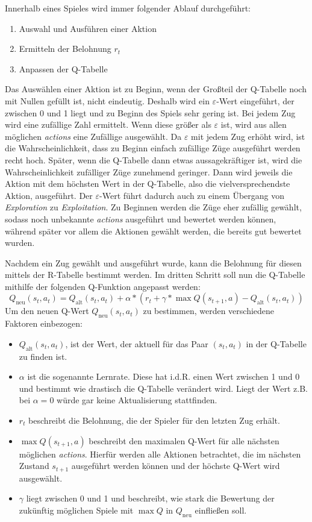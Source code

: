 \documentclass[12pt,a4paper]{article}
\begin{document}
Innerhalb eines Spieles wird immer folgender Ablauf durchgeführt:
\begin{enumerate}
    \item Auswahl und Ausführen einer Aktion
    \item Ermitteln der Belohnung $r_t$
    \item Anpassen der Q-Tabelle
\end{enumerate}
Das Auswählen einer Aktion ist zu Beginn, wenn der Großteil der Q-Tabelle noch mit Nullen gefüllt ist, nicht eindeutig. Deshalb wird ein $\varepsilon$-Wert eingeführt, der zwischen 0 und 1 liegt und zu Beginn des Spiels sehr gering ist. Bei jedem Zug wird eine zufällige Zahl ermittelt. Wenn diese größer als $\varepsilon$ ist, wird aus allen möglichen \textit{actions} eine Zufällige ausgewählt. Da $\varepsilon$ mit jedem Zug erhöht wird, ist die Wahrscheinlichkeit, dass zu Beginn einfach zufällige Züge ausgeführt werden recht hoch. Später, wenn die Q-Tabelle dann etwas aussagekräftiger ist, wird die Wahrscheinlichkeit zufälliger Züge zunehmend geringer. Dann wird jeweils die Aktion mit dem höchsten Wert in der Q-Tabelle, also die vielversprechendste Aktion, ausgeführt. Der $\varepsilon$-Wert führt dadurch auch zu einem Übergang von \textit{Exploration} zu \textit{Exploitation}. Zu Beginnen werden die Züge eher zufällig gewählt, sodass noch unbekannte \textit{actions} ausgeführt und bewertet werden können, während später vor allem die Aktionen gewählt werden, die bereits gut bewertet wurden. 

Nachdem ein Zug gewählt und ausgeführt wurde, kann die Belohnung für diesen mittels der R-Tabelle bestimmt werden. Im dritten Schritt soll nun die Q-Tabelle mithilfe der folgenden Q-Funktion angepasst werden:
$$Q_{\mathrm{neu}}(s_t,a_t)=Q_{\mathrm{alt}}(s_t,a_t)+\alpha*(r_t+\gamma*\max Q(s_{t+1},a)-Q_{\mathrm{alt}}(s_t,a_t))$$
Um den neuen Q-Wert $Q_{\mathrm{neu}}(s_t,a_t)$ zu bestimmen, werden verschiedene Faktoren einbezogen:

\begin{itemize}
    \item $Q_{\mathrm{alt}}(s_t,a_t)$, ist der Wert, der aktuell für das Paar $(s_t,a_t)$ in der Q-Tabelle zu finden ist.
    \item $\alpha$ ist die sogenannte Lernrate. Diese hat i.d.R. einen Wert zwischen 1 und 0 und bestimmt wie drastisch die Q-Tabelle verändert wird. Liegt der Wert z.B. bei $\alpha =0$ würde gar keine Aktualisierung stattfinden.
    \item $r_t$ beschreibt die Belohnung, die der Spieler für den letzten Zug erhält.
    \item $\max Q(s_{t+1},a)$ beschreibt den maximalen Q-Wert für alle nächsten möglichen \textit{actions}. Hierfür werden alle Aktionen betrachtet, die im nächsten Zustand $s_{t+1}$ ausgeführt werden können und der höchste Q-Wert wird ausgewählt.
    \item $\gamma$ liegt zwischen 0 und 1 und beschreibt, wie stark die Bewertung der zukünftig möglichen Spiele mit $\max Q$ in $Q_{\mathrm{neu}}$ einfließen soll.
\end{itemize}
\end{document}
